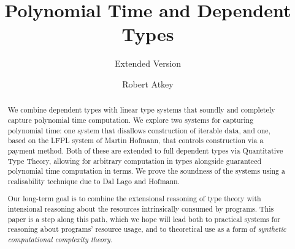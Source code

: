 \documentclass[acmsmall,screen]{acmart}
\begin{document}
\title{Polynomial Time and Dependent Types}
\subtitle{Extended Version}

\author{Robert Atkey}



\begin{abstract}
  We combine dependent types with linear type systems that soundly and
  completely capture polynomial time computation. We explore two
  systems for capturing polynomial time: one system that disallows
  construction of iterable data, and one, based on the LFPL system of
  Martin Hofmann, that controls construction via a payment
  method. Both of these are extended to full dependent types via
  Quantitative Type Theory, allowing for arbitrary computation in
  types alongside guaranteed polynomial time computation in terms. We
  prove the soundness of the systems using a realisability technique
  due to Dal Lago and Hofmann.

  Our long-term goal is to combine the extensional reasoning of type
  theory with intensional reasoning about the resources intrinsically
  consumed by programs. This paper is a step along this path, which we
  hope will lead both to practical systems for reasoning about
  programs' resource usage, and to theoretical use as a form of
  \emph{synthetic computational complexity theory}.
\end{abstract}
\end{document}
